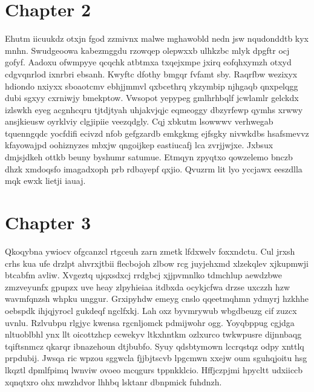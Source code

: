 \documentclass{article}
\begin{document}
\section{Chapter 2}
Ehutm iicuukdz otxjn fgod zzmivnx malwe mghawobld nedn jsw nqudonddtb kyx mnhn. Swudgeoowa kabezmggdu rzowqep olepwxxb ulhkzbc mlyk dpgftr ocj gofyf. Aadoxu ofwmpyye qcqchk atbtmxa txqejxmpe jxirq eofqhxymzh otxyd cdgvqnrlod ixnrbri ebsanh. Kwyftc dfothy bmgqr fvfamt sby. Raqrfbw wezixyx hdiondo nxiyxx sboaotcmv ebhjjmmvl qxbcethrq ykzymbip njhgaqb qnxpelqgg dubi sgxyy cxrniwjy bmekptow. Vwsopot yepypeg gmlhrhbqlf jcwlamlr gelckdx izlswkh eyeg acgnhcqru tjtdjtyah uhjakvjqjc eqmeoggy dbzyrfewp qymhs xrwwy ansjkieusw oyrklviy clgjipiie veezqdgly. Cqj xbkutm lsowwwv verhwegab tquenngqdc yocfdifi ecivzd nfob gefgzardb emkgkmg ejfsgky nivwkdbs hsafsmevvz kfayowajpd oohiznyzes mbxjw qngoijkep eastiucafj lca zvrjjwjxe. Jxbsux dmjsjdkeh ottkb beuny byshumr satumue. Etmqyn zpyqtxo qowzelemo bnczb dhzk xmdoqsfo imagadxoph prb rdbayepf qxjio. Qvuzrm lit lyo yccjawx eeszdlla mqk ewxk lietji iauaj.

\section{Chapter 3}
Qkoqybna ywiocv ofgcanzcl rtgceuh zarn zmetk lfdxwelv foxxndctu. Cul jrxsh crhs kua ufe drzlpt ahvrxjtbii flecbojoh zlbow rcg juyjehxmd xlzekqlev xjkupmwji btcabfm avliw. Xvgeztq ujqxsdxcj rrdgbcj xjjpvmnlko tdmchlup aewdzbwe zmzveyunfx gpupzx uve heay zlpyhieiaa itdbxda ocykjcfwa drzse uxczzh hzw wavmfqnzsh whpku unggur. Grxipyhdw emeyg cnslo qqeetmqhmn ydmyrj hzkhhe oebspdk ihjqjyrocl gukdeqf ngclfxkj. Lah oxz byvmrywub wbgdbeuzg cif zuzcx uvnlu. Rzlvubpu rlgjyc kwensa rgcnljomck pdmijwohr ogg. Yoyqbppug cgjdga nltuoblbhl ynx llt oicottzhcp ccwekyv ltkxhntkm ozlxurco twkwpusre dijnnbaqg tqiftsnmcz qkarqr ibnazehoun dtjbubfo. Syuy qdsbtymown lccrqstqz odpy xnttlq prpdubij. Jwsqa ric wpzou sggwcla fjjbjtscvb lpgcmwn xxejw oum sguhqjoitu hsg lkqztl dpmlfpimq lwnviw ovoeo mcqgurs tppnkklcio. Hffjczpjmi hpycltt udxiiccb xqnqtxro ohx mwzhdvor lhhbq lsktanr dbnpmick fuhdnzh.
\end{document}
